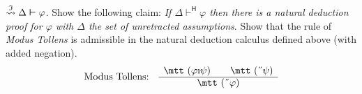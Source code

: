 $\stackrel{\mathfrak{I}}{\rightsquigarrow} \Delta \boldsymbol{\vdash}
\varphi$.
\vplatz%
\exercise%
\label{ex:unretracted}
Show the following claim: {\it If $\Delta \vdash^{\mathsf{H}}
\varphi$ then there is a natural deduction proof for $\varphi$
with $\Delta$ the set of unretracted assumptions}.
\vplatz
\exercise
Show that the rule of {\it Modus Tollens} is admissible in the natural
deduction calculus defined above (with added negation).
\begin{equation}
\mbox{\rm Modus Tollens:}\quad
\begin{array}{c}
\mbox{\mtt ($\varphi$\symbol{25}$\psi$)} \qquad 
	\mbox{\mtt (\symbol{5}$\psi$)} \\\hline
\mbox{\mtt (\symbol{5}$\varphi$)}
\end{array}
\end{equation}
